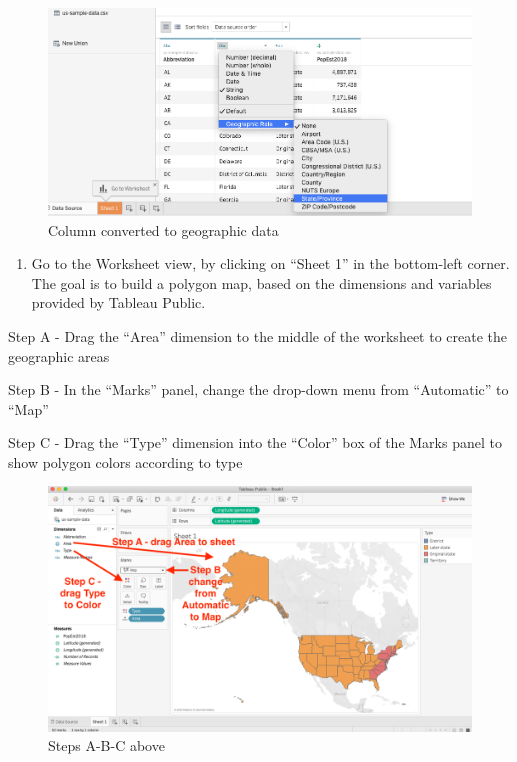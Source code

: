 \documentclass[
  english,
]{book}
\providecommand{\tightlist}{%
  \setlength{\itemsep}{0pt}\setlength{\parskip}{0pt}}
\begin{document}
\begin{figure}
\centering
\includegraphics{images/06-map/tableau-polygon-2.png}
\caption{Column converted to geographic data}
\end{figure}

\begin{enumerate}
\def\labelenumi{\arabic{enumi})}
\setcounter{enumi}{5}
\tightlist
\item
  Go to the Worksheet view, by clicking on ``Sheet 1'' in the bottom-left corner. The goal is to build a polygon map, based on the dimensions and variables provided by Tableau Public.
\end{enumerate}

Step A - Drag the ``Area'' dimension to the middle of the worksheet to create the geographic areas

Step B - In the ``Marks'' panel, change the drop-down menu from ``Automatic'' to ``Map''

Step C - Drag the ``Type'' dimension into the ``Color'' box of the Marks panel to show polygon colors according to type

\begin{figure}
\centering
\includegraphics{images/06-map/tableau-polygon-3.png}
\caption{Steps A-B-C above}
\end{figure}
\end{document}

